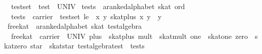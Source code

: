 \begin{isabellebody}
\ \ {}test{}set\ {}\ test\ {}\ UNIV{}\isanewline
\isanewline
{}\isamarkupfalse%
\ tests\ {}{}\ {}{}a{}{}ranked{}alphabet\ skat\ ord{}\ \isanewline
\ \ {}tests\ {}\ {}carrier\ {}\ test{}set{}\ le\ {}\ {}{}x\ y{}\ skat{}plus\ x\ y\ {}\ y{}{}{}\isanewline
\isanewline
{}\isamarkupfalse%
\ free{}kat\ {}{}\ {}{}a{}{}ranked{}alphabet\ skat\ test{}algebra{}\ \isanewline
\ \ {}free{}kat\ {}\ {}carrier\ {}\ UNIV{}\ plus\ {}\ skat{}plus{}\ mult\ {}\ skat{}mult{}\ one\ {}\ skat{}one{}\ zero\ {}\ skat{}zero{}\ star\ {}\ skat{}star{}\ test{}algebra{}test\ {}\ tests{}{}\isanewline

\end{isabellebody}
